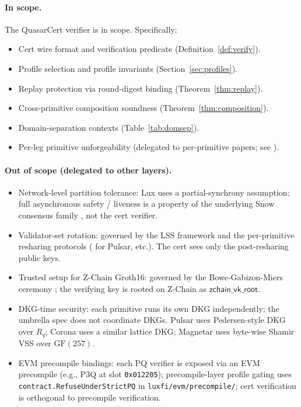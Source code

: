 \paragraph{In scope.} The QuasarCert verifier is in scope.
Specifically:

\begin{itemize}[leftmargin=2em,nosep]
\item Cert wire format and verification predicate
      (Definition~\ref{def:verify}).
\item Profile selection and profile invariants
      (Section~\ref{sec:profiles}).
\item Replay protection via round-digest binding
      (Theorem~\ref{thm:replay}).
\item Cross-primitive composition soundness
      (Theorem~\ref{thm:composition}).
\item Domain-separation contexts (Table~\ref{tab:domsep}).
\item Per-leg primitive unforgeability (delegated to per-primitive
      papers; see \cite{pulsar,corona,magnetar,
      quasarcertsoundness}).
\end{itemize}

\paragraph{Out of scope (delegated to other layers).}

\begin{itemize}[leftmargin=2em,nosep]
\item Network-level partition tolerance: Lux uses a partial-synchrony
      assumption; full asynchronous safety / liveness is a property
      of the underlying Snow consensus family
      \cite{lp020,garaybackbone}, not the cert verifier.
\item Validator-set rotation: governed by the LSS framework
      \cite{luxlssmpc} and the per-primitive resharing protocols
      (\cite{pulsar} for Pulsar, etc.). The cert sees only the
      post-resharing public keys.
\item Trusted setup for Z-Chain Groth16: governed by the
      Bowe-Gabizon-Miers ceremony \cite{bowegabizonmiers}; the
      verifying key is rooted on Z-Chain as
      $\mathsf{zchain\_vk\_root}$.
\item DKG-time security: each primitive runs its own DKG
      independently; the umbrella spec does not coordinate DKGs.
      Pulsar uses Pedersen-style DKG over $R_q$; Corona uses
      a similar lattice DKG; Magnetar uses byte-wise Shamir VSS
      over $\mathrm{GF}(257)$.
\item EVM precompile bindings: each PQ verifier is exposed via an
      EVM precompile (e.g., P3Q at slot \texttt{0x012205});
      precompile-layer profile gating uses
      \texttt{contract.RefuseUnderStrictPQ} in
      \texttt{luxfi/evm/precompile/}; cert verification is
      orthogonal to precompile verification.
\end{itemize}

